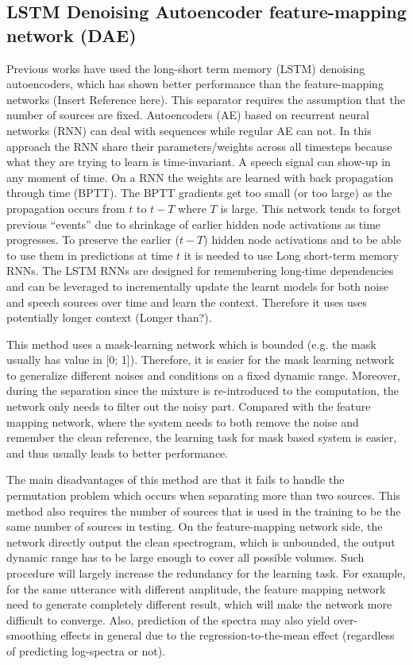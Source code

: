 \documentclass{article}
\begin{document}
\subsection{LSTM Denoising Autoencoder feature-mapping network (DAE)}
Previous works have used the long-short term memory (LSTM) denoising autoencoders, which has  shown better performance than the feature-mapping networks (Insert Reference here). This separator requires the assumption that the number of sources are fixed. Autoencoders (AE) based on  recurrent neural networks (RNN)  can deal with sequences while regular AE can not. In this approach the 
RNN share their parameters/weights across all timesteps because what they are trying to learn is time-invariant. A speech signal can show-up in any moment of time. On a RNN the weights are learned with back propagation through time (BPTT). The BPTT gradients get too small (or too large) as the propagation  occurs from $t$ to $t-T$ where $T$ is large. This network tends to forget previous “events” due to shrinkage of earlier hidden node activations as time progresses. To preserve the earlier ($t-T$) hidden node activations and to be able to use them in predictions at time $t$ it is needed to use Long short-term memory RNNs. 
The LSTM RNNs are designed for remembering long-time dependencies and can be leveraged to incrementally update the learnt models for both noise and speech sources over time and learn the context. Therefore it uses uses potentially longer context (Longer than?).  

This method uses a mask-learning network which  is bounded (e.g. the mask usually has value in [0; 1]). Therefore, it is easier for the mask learning network to generalize different noises and conditions  on a fixed dynamic range. Moreover, during the separation since the mixture is re-introduced to the computation, the network only needs to filter out the noisy part. Compared with the feature mapping network, where the system needs to both remove the noise and remember the clean reference, the learning task for mask based system is easier, and thus usually leads to better performance.

The main disadvantages of this method are that it fails to handle the permutation problem which occurs when separating more than two sources. This method also requires the number of sources that is used in the training to be the same number of sources in testing. On the feature-mapping network side,  the network directly output the clean spectrogram, which is unbounded, the output dynamic range has to be large enough to cover all possible volumes. Such procedure will largely increase the redundancy for the learning task. For example, for the same utterance with different amplitude, the feature mapping network need to generate completely different result, which will make the network more difficult to converge. Also, prediction of the spectra may also yield over-smoothing effects in general due to the regression-to-the-mean effect (regardless of predicting log-spectra or not).
\end{document}
